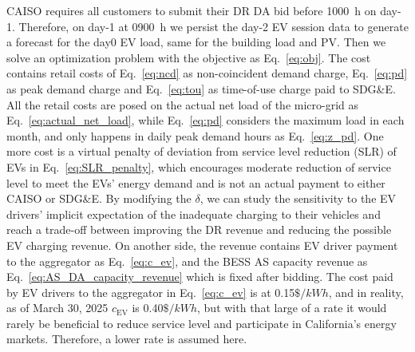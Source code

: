 \documentclass[conference]{IEEEtran}
\begin{document}
CAISO requires all customers to submit their DR DA bid before 1000~h on day-1. Therefore, on day-1 at 0900~h we persist the day-2 EV session data to generate a forecast for the day0 EV load, same for the building load and PV. Then we solve an optimization problem with the objective as Eq.~\ref{eq:obj}. The cost contains retail costs of Eq.~\ref{eq:ncd} as non-coincident demand charge, Eq.~\ref{eq:pd} as peak demand charge and Eq.~\ref{eq:tou} as time-of-use charge paid to SDG\&E. All the retail costs are posed on the actual net load of the micro-grid as Eq.~\ref{eq:actual_net_load}, while Eq.~\ref{eq:pd} considers the maximum load in each month, and only happens in daily peak demand hours as Eq.~\ref{eq:z_pd}. One more cost is a virtual penalty of deviation from service level reduction (SLR) of EVs in Eq.~\ref{eq:SLR_penalty}, which encourages moderate reduction of service level to meet the EVs' energy demand and is not an actual payment to either CAISO or SDG\&E. By modifying the $\delta$, we can study the sensitivity to the EV drivers' implicit expectation of the inadequate charging to their vehicles and reach a trade-off between improving the DR revenue and reducing the possible EV charging revenue. On another side, the revenue contains EV driver payment to the aggregator as Eq.~\ref{eq:c_ev}, and the BESS AS capacity revenue as Eq.~\ref{eq:AS_DA_capacity_revenue} which is fixed after bidding. The cost paid by EV drivers to the aggregator in Eq.~\ref{eq:c_ev} is at 0.15$\$/kWh$, and in reality, as of March 30, 2025 $c_{\text{EV}}$ is 0.40$\$/kWh$, but with that large of a rate it would rarely be beneficial to reduce service level and participate in California's energy markets. Therefore, a lower rate is assumed here. 
\end{document}

